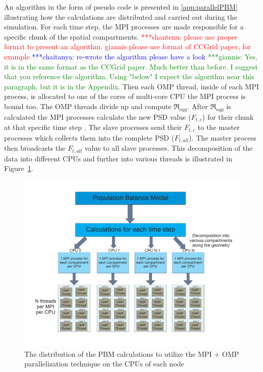 \documentclass[preprint,11pt,authoryear]{elsarticle}
\newcommand{\jhanote}[1]{ {\textcolor{red} { ***shantenu: #1 }}}
\newcommand{\csnote}[1]{ {\textcolor{blue} { ***chaitanya: #1 }}}
\newcommand{\gpnote}[1]{{\textcolor{green} {***giannis: #1}}}
\newcommand{\jhanote}[1]{}
\newcommand{\csnote}[1]{}
\newcommand{\gpnote}[1]{}
\begin{document}
An algorithm in the form of pseudo code is presented in \ref{app:parallelPBM} illustrating how
the calculations are distributed and carried out during the simulation. For
each time step, the MPI processes are made responsible for a specific chunk of
the spatial compartments. 
\jhanote{please use proper format to present an
algorithm. giannis please use format of CCGrid paper, for example} \csnote{re-wrote the algorithm please have a look}
\gpnote{Yes, it is in the same format as the CCGrid paper. Much better than before. I suggest that you reference the algorithm. Using "below" I expect the algorithm near this paragraph, but it is in the Appendix.} Then each OMP thread, inside of each MPI process, is allocated to one of the cores of
multi-core CPU the MPI process is bound too. The OMP threads divide up and
compute $\Re_{agg}$. After $\Re_{agg}$ is calculated the MPI processes
calculate the new PSD value ($F_{t,c}$) for their chunk at that specific time step
. The slave processes send their $F_{t,c}$ to the master processes
which collects them into the complete PSD ($F_{t,all}$). The master process then
broadcasts the $F_{t,all}$ value to all slave processes. This decomposition of
the data into different CPUs and further into various threads is illustrated
in Figure~\ref{fig:mthds_PBM_decompostion}.

\begin{figure}
\centering
\includegraphics[scale=0.45]{PBM_decomposition.pdf}
\caption{The distribution of the PBM calculations to utilize the MPI + OMP parallelization technique on the CPUs of each node}
\label{fig:mthds_PBM_decompostion}
\end{figure}
\end{document}

